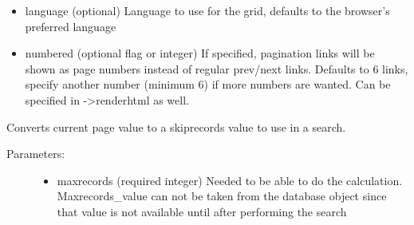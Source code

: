 \documentclass[letterpaper,10pt,english]{sphinxmanual}
\begin{document}
\begin{fulllineitems}
\begin{fulllineitems}
\begin{description}
\begin{itemize}
\item {} 
language (optional)
Language to use for the grid, defaults to the browser's preferred language

\item {} 
numbered (optional flag or integer)
If specified, pagination links will be shown as page numbers instead of regular prev/next links.
Defaults to 6 links, specify another number (minimum 6) if more numbers are wanted. Can be specified in -\textgreater{}renderhtml as well.

\end{itemize}

\end{description}

\end{fulllineitems}


\begin{fulllineitems}
\label{knop_grid:knop_grid.page}
\end{fulllineitems}



\begin{fulllineitems}
\end{fulllineitems}


\begin{fulllineitems}
\label{knop_grid:knop_grid.page_skiprecords}
Converts current page value to a skiprecords value to use in a search.
\begin{description}
\item[{Parameters:}] \leavevmode\begin{itemize}
\item {} 
maxrecords (required integer)
Needed to be able to do the calculation. Maxrecords\_value can not be taken
from the database object since that value is not available until after
performing the search

\end{itemize}

\end{description}

\end{fulllineitems}



\end{fulllineitems}
\end{document}
